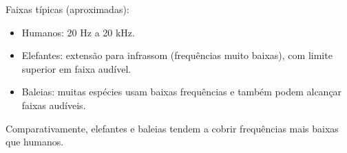 Faixas típicas (aproximadas):
\begin{itemize}
\item Humanos: 20 Hz a 20 kHz.
\item Elefantes: extensão para infrassom (frequências muito baixas), com limite superior em faixa audível.
\item Baleias: muitas espécies usam baixas frequências e também podem alcançar faixas audíveis.
\end{itemize}
Comparativamente, elefantes e baleias tendem a cobrir frequências mais baixas que humanos.

